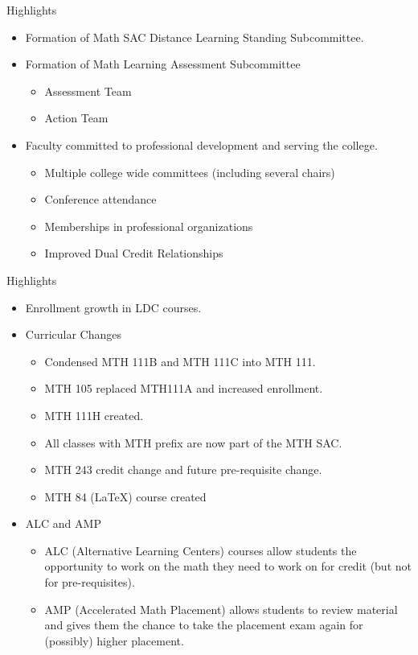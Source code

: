 \documentclass{beamer}
\begin{document}
\begin{frame}{Highlights}
\begin{itemize}
\pause \item Formation of Math SAC Distance Learning Standing Subcommittee.
\pause \item Formation of Math Learning Assessment Subcommittee
	\begin{itemize}
	\pause \item Assessment Team
	\pause \item Action Team
\end{itemize}

\pause \item Faculty committed to professional development and serving the college. 
	\begin{itemize}
	\pause \item Multiple college wide committees (including several chairs)
	\pause \item Conference attendance
	\pause \item Memberships in professional organizations
	\pause \item Improved Dual Credit Relationships
	\end{itemize}

\end{itemize}
\end{frame}

\begin{frame}{Highlights}
\begin{itemize}

\pause \item Enrollment growth in LDC courses. 
\pause \item Curricular Changes
	\begin{itemize}
	\pause \item  Condensed MTH 111B and MTH 111C into MTH 111. 
	\pause \item MTH 105 replaced MTH111A and increased enrollment.  
	\pause \item MTH 111H created. 
	\pause \item All classes with MTH prefix are now part of the MTH SAC. 
	\pause \item MTH 243 credit change and future pre-requisite change. 
	\pause \item MTH 84 (LaTeX) course created
	\end{itemize}
\pause \item ALC and AMP
	\begin{itemize}
	\pause \item ALC (Alternative Learning Centers) courses allow students the opportunity to work on the math they need to work on for credit (but not for pre-requisites). 
	\pause \item AMP (Accelerated Math Placement) allows students to review material and gives them the chance to take the placement exam again for (possibly) higher placement. 
	\end{itemize}

\end{itemize}
\end{frame}
 
\end{document}
